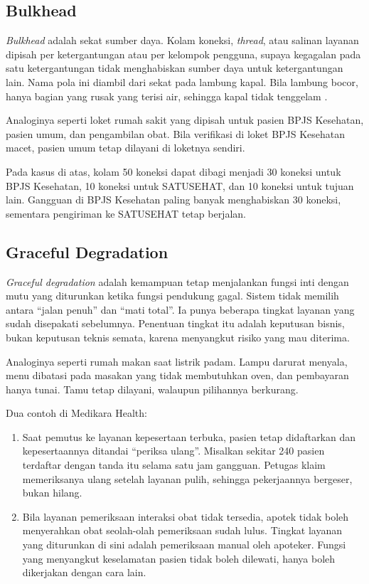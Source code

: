 \subsection{Bulkhead}

\textit{Bulkhead} adalah sekat sumber daya. Kolam koneksi, \textit{thread}, atau salinan layanan
dipisah per ketergantungan atau per kelompok pengguna, supaya kegagalan pada satu ketergantungan
tidak menghabiskan sumber daya untuk ketergantungan lain. Nama pola ini diambil dari sekat pada
lambung kapal. Bila lambung bocor, hanya bagian yang rusak yang terisi air, sehingga kapal tidak
tenggelam \cite{c12-azure-bulkhead}.

Analoginya seperti loket rumah sakit yang dipisah untuk pasien BPJS Kesehatan, pasien umum, dan
pengambilan obat. Bila verifikasi di loket BPJS Kesehatan macet, pasien umum tetap dilayani di
loketnya sendiri.

Pada kasus di atas, kolam 50 koneksi dapat dibagi menjadi 30 koneksi untuk BPJS Kesehatan, 10
koneksi untuk SATUSEHAT, dan 10 koneksi untuk tujuan lain. Gangguan di BPJS Kesehatan paling banyak
menghabiskan 30 koneksi, sementara pengiriman ke SATUSEHAT tetap berjalan.

\subsection{Graceful Degradation}

\textit{Graceful degradation} adalah kemampuan tetap menjalankan fungsi inti dengan mutu yang
diturunkan ketika fungsi pendukung gagal. Sistem tidak memilih antara ``jalan penuh'' dan ``mati
total''. Ia punya beberapa tingkat layanan yang sudah disepakati sebelumnya. Penentuan tingkat itu
adalah keputusan bisnis, bukan keputusan teknis semata, karena menyangkut risiko yang mau diterima.

Analoginya seperti rumah makan saat listrik padam. Lampu darurat menyala, menu dibatasi pada
masakan yang tidak membutuhkan oven, dan pembayaran hanya tunai. Tamu tetap dilayani, walaupun
pilihannya berkurang.

Dua contoh di Medikara Health:
\begin{enumerate}
  \item Saat pemutus ke layanan kepesertaan terbuka, pasien tetap didaftarkan dan kepesertaannya
        ditandai ``periksa ulang''. Misalkan sekitar 240 pasien terdaftar dengan tanda itu selama
        satu jam gangguan. Petugas klaim memeriksanya ulang setelah layanan pulih, sehingga
        pekerjaannya bergeser, bukan hilang.
  \item Bila layanan pemeriksaan interaksi obat tidak tersedia, apotek tidak boleh menyerahkan
        obat seolah-olah pemeriksaan sudah lulus. Tingkat layanan yang diturunkan di sini adalah
        pemeriksaan manual oleh apoteker. Fungsi yang menyangkut keselamatan pasien tidak boleh
        dilewati, hanya boleh dikerjakan dengan cara lain.
\end{enumerate}

